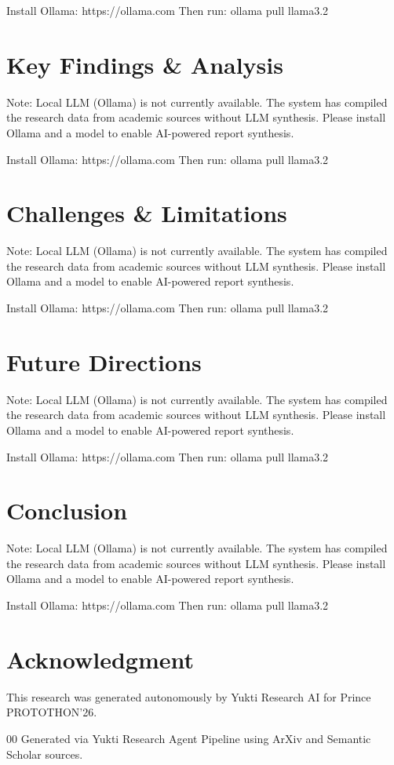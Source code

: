 \documentclass[conference]{IEEEtran}
\begin{document}
Install Ollama: https://ollama.com
Then run: ollama pull llama3.2

\section{Key Findings \& Analysis}
Note: Local LLM (Ollama) is not currently available. The system has compiled the research data from academic sources without LLM synthesis. Please install Ollama and a model to enable AI-powered report synthesis.

Install Ollama: https://ollama.com
Then run: ollama pull llama3.2

\section{Challenges \& Limitations}
Note: Local LLM (Ollama) is not currently available. The system has compiled the research data from academic sources without LLM synthesis. Please install Ollama and a model to enable AI-powered report synthesis.

Install Ollama: https://ollama.com
Then run: ollama pull llama3.2

\section{Future Directions}
Note: Local LLM (Ollama) is not currently available. The system has compiled the research data from academic sources without LLM synthesis. Please install Ollama and a model to enable AI-powered report synthesis.

Install Ollama: https://ollama.com
Then run: ollama pull llama3.2

\section{Conclusion}
Note: Local LLM (Ollama) is not currently available. The system has compiled the research data from academic sources without LLM synthesis. Please install Ollama and a model to enable AI-powered report synthesis.

Install Ollama: https://ollama.com
Then run: ollama pull llama3.2


\section*{Acknowledgment}
This research was generated autonomously by Yukti Research AI for Prince PROTOTHON'26.

\begin{thebibliography}{00}
 Generated via Yukti Research Agent Pipeline using ArXiv and Semantic Scholar sources.
\end{thebibliography}
\end{document}
